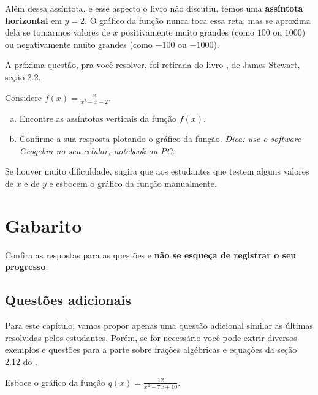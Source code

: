 \documentclass[main.tex]{subfiles}
\begin{document}
Além dessa assíntota, e esse aspecto o livro não discutiu, temos uma \textbf{assíntota horizontal} em $y=2$. O gráfico da função nunca toca essa reta, mas se aproxima dela se tomarmos valores de $x$ positivamente muito grandes (como $100$ ou $1000$) ou negativamente muito grandes (como $-100$ ou $-1000$).

A próxima questão, pra você resolver, foi retirada do livro , de James Stewart, seção 2.2.

\begin{resolva}
Considere $f(x)=\frac{x}{x^2-x-2}$.
\begin{enumerate}[a)]
 \item Encontre as assíntotas verticais da função $f(x)$.
 \item Confirme a sua resposta plotando o gráfico da função. \textit{Dica: use o software Geogebra no seu celular, notebook ou PC.}
\end{enumerate}
\end{resolva}

\paraTutores

Se houver muito dificuldade, sugira que aos estudantes que testem alguns valores de $x$ e de $y$ e esbocem o gráfico da função manualmente.

\paraAmbos

\section{Gabarito}

Confira as respostas para as questões e \textbf{não se esqueça de registrar o seu progresso}.

\imprimeGabarito

\paraTutores

\subsection{Questões adicionais}

Para este capítulo, vamos propor apenas uma questão adicional similar as últimas resolvidas pelos estudantes. Porém, se for necessário você pode extrir diversos exemplos e questões para a parte sobre frações algébricas e equações da seção 2.12 do .

\begin{adicional}
Esboce o gráfico da função $q(x)=\frac{12}{x^2-7x+10}$.
\end{adicional}
\end{document}

